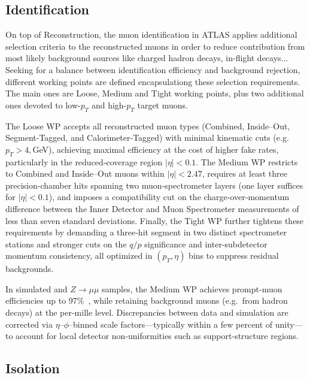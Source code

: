 \subsection*{Identification} 

On top of Reconstruction, the muon identification in ATLAS applies additional selection criteria to the reconstructed muons in order to reduce contribution from most likely background sources like charged hadron decays, in-flight decays...
Seeking for a balance between identification efficiency and background rejection, different working points are defined encapsulationg these selection requirements. The main ones are Loose, Medium and Tight working points, plus two additional ones devoted to low-$p_{T}$ and high-$p_{T}$ target muons.

The Loose WP accepts all reconstructed muon types (Combined, Inside–Out, Segment‐Tagged, and Calorimeter‐Tagged) with minimal kinematic cuts (e.g.\ $p_T>4,$GeV), achieving maximal efficiency at the cost of higher fake rates, particularly in the reduced‐coverage region $|\eta|<0.1$. The Medium WP restricts to Combined and Inside–Out muons within $|\eta|<2.47$, requires at least three precision‐chamber hits spanning two muon‐spectrometer layers (one layer suffices for $|\eta|<0.1$), and imposes a compatibility cut on the charge‐over‐momentum difference between the Inner Detector and Muon Spectrometer measurements of less than seven standard deviations. Finally, the Tight WP further tightens these requirements by demanding a three‐hit segment in two distinct spectrometer stations and stronger cuts on the $q/p$ significance and inter‐subdetector momentum consistency, all optimized in $(p_T,\eta)$ bins to suppress residual backgrounds.

In simulated \ttbar and $Z\to\mu\mu$ samples, the Medium WP achieves prompt‐muon efficiencies up to 97$\%$~\cite{muon_reco_run2}, while retaining background muons (e.g.\ from hadron decays) at the per‐mille level. Discrepancies between data and simulation are corrected via $\eta$–$\phi$–binned scale factors—typically within a few percent of unity—to account for local detector non‐uniformities such as support‐structure regions.

\subsection*{Isolation} 

